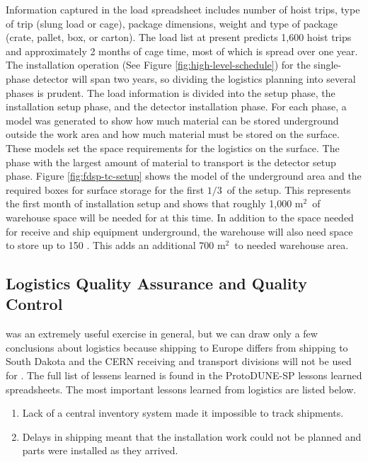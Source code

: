 Information captured in the load spreadsheet includes number of hoist trips, type of trip (slung load or cage), package dimensions, weight and type of package (crate, pallet, box, or carton). The load list at present predicts 1,600 hoist trips and approximately 2 months of cage time, most of which is spread over one year. The installation operation (See Figure \ref{fig:high-level-schedule}) for the single-phase detector will span two years, so dividing the logistics planning into several phases is prudent. The load information is divided into the  setup phase, the installation setup phase, and the detector installation phase. For each phase, a model was generated to show how much material can be stored underground outside the work area and how much material must be stored on the surface. These models set the space requirements for the logistics on the surface. The phase with the largest amount of material to transport is the detector setup phase. Figure \ref{fig:fdsp-tc-setup} shows the model of the underground area and the required boxes for surface storage for the first $1/3$\ of the setup. This represents the first month of installation setup and shows that roughly 1,000 m$^2$\ of warehouse space will be needed for  at this time. In addition to the space needed for receive and ship equipment underground, the warehouse will also need space to store up to 150 . This adds an additional 700 m$^2$\ to needed warehouse area. 


\subsection{Logistics Quality Assurance and Quality Control}
\label{sec:fdsp-tc-log-qaqc}


 was an extremely useful exercise in general, but we can draw only a few conclusions about  logistics because shipping to Europe differs from shipping to South Dakota and the CERN receiving and transport divisions will not be used for . 
The full list of lessens learned is found in the ProtoDUNE-SP lessons learned spreadsheets.\cite{bib:docdb8255} 
The most important lessons learned from  logistics are listed below.
\begin{enumerate}
\item Lack of a central inventory system made it impossible to track shipments.
\item Delays in shipping meant that the installation work could not be planned and parts were installed as they arrived. 
\end{enumerate}

